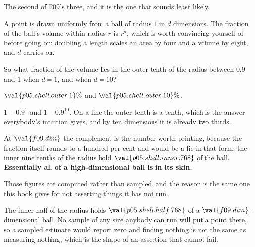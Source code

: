 \begin{fr}
The second of F09's three, and it is the one that sounds least likely.

A point is drawn uniformly from a ball of radius $1$ in $d$ dimensions. The
fraction of the ball's volume within radius $r$ is $r^{d}$, which is worth
convincing yourself of before going on: doubling a length scales an area by
four and a volume by eight, and $d$ carries on.

So what fraction of the volume lies in the outer tenth of the radius \dash{}
between $\num{0.9}$ and $1$ \dash{} when $d = 1$, and when $d = 10$?
\dotline
\nextframe
\end{fr}

\begin{fr}
\begin{ansblock}
$\val{p05.shell.outer.1}\%$ and $\val{p05.shell.outer.10}\%$.
\end{ansblock}

$1 - \num{0.9}^{1}$ and $1 - \num{0.9}^{10}$. On a line the outer tenth is a tenth, which
is the answer everybody's intuition gives, and by ten dimensions it is already
two thirds.

At $\val{f09.dim}$ the complement is the number worth printing, because the
fraction itself rounds to a hundred per cent and would be a lie in that form:
the inner nine tenths of the radius hold $\val{p05.shell.inner.768}$ of the
ball. \textbf{Essentially all of a high-dimensional ball is in its skin.}
\end{fr}

\begin{fr}
\begin{note}
Those figures are computed rather than sampled, and the reason is the same one
this book gives for not asserting things it has not run.

The inner half of the radius holds $\val{p05.shell.half.768}$ of a
$\val{f09.dim}$-dimensional ball. No sample of any size anybody can run will
put a point there, so a sampled estimate would report zero \dash{} and finding
nothing is not the same as measuring nothing, which is the shape of an
assertion that cannot fail.
\end{note}
\end{fr}


